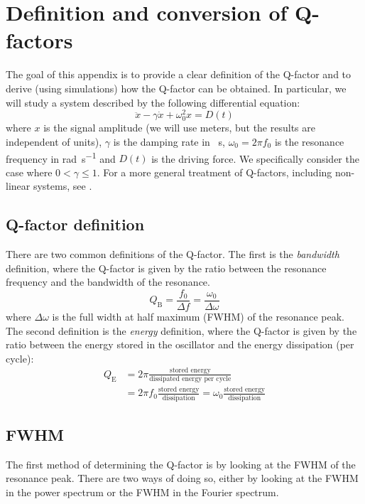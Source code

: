 \chapter{Definition and conversion of Q-factors}
\label{app:q_factors}

The goal of this appendix is to provide a clear definition of the Q-factor and to derive (using simulations) how the Q-factor can be obtained. In particular, we will study a system described by the following differential equation:
\begin{equation}
    \ddot{x} - \gamma \dot{x} + \omega_0^2 x = D(t)
    \tag{damped h.o.}
\end{equation}
where $x$ is the signal amplitude (we will use meters, but the results are independent of units), $\gamma$ is the damping rate in \unit{\per\second}, $\omega_0 = 2\pi f_0$ is the resonance frequency in \unit{\radian\per\second} and $D(t)$ is the driving force. We specifically consider the case where $0 < \gamma \leq 1$. For a more general treatment of Q-factors, including non-linear systems, see \textcite{wang_rigorous_2017}.

\section{Q-factor definition}
There are two common definitions of the Q-factor. The first is the \textit{bandwidth} definition, where the Q-factor is given by the ratio between the resonance frequency and the bandwidth of the resonance.
\begin{equation}
    Q_\text{B} = \frac{f_0}{\Delta f} = \frac{\omega_0}{\Delta \omega}
    \tag{bandwidth definition}
\end{equation}
where $\Delta \omega$ is the full width at half maximum (FWHM) of the resonance peak. The second definition is the \textit{energy} definition, where the Q-factor is given by the ratio between the energy stored in the oscillator and the energy dissipation (per cycle):
\begin{align}
    Q_\text{E} &= 2\pi \frac{\text{stored energy}}{\text{dissipated energy per cycle}} \nonumber \\
               &= 2\pi f_0 \frac{\text{stored energy}}{\text{dissipation}} = \omega_0 \frac{\text{stored energy}}{\text{dissipation}} \tag{energy definition}
\end{align}

\section{FWHM}
The first method of determining the Q-factor is by looking at the FWHM of the resonance peak. There are two ways of doing so, either by looking at the FWHM in the power spectrum or the FWHM in the Fourier spectrum.

